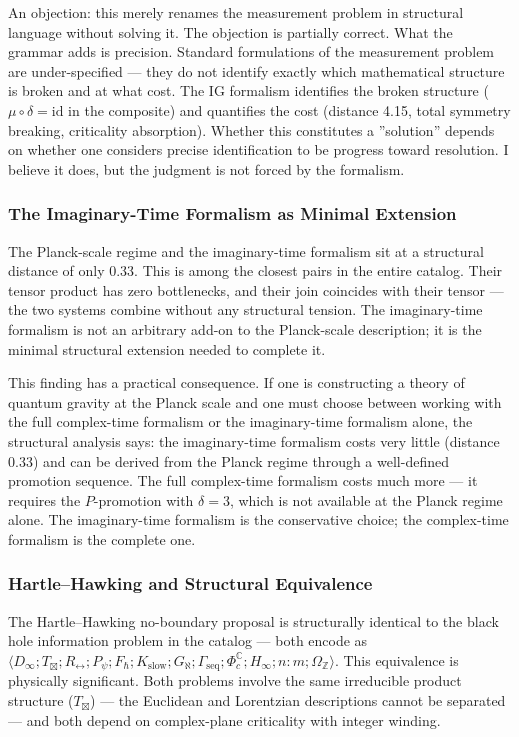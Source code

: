 \documentclass[12pt,a4paper]{article}
\begin{document}
An objection: this merely renames the measurement problem in structural language without solving it. The objection is partially correct. What the grammar adds is precision. Standard formulations of the measurement problem are under-specified --- they do not identify exactly which mathematical structure is broken and at what cost. The IG formalism identifies the broken structure ($\mu \circ \delta = \text{id}$ in the composite) and quantifies the cost (distance 4.15, total symmetry breaking, criticality absorption). Whether this constitutes a ''solution'' depends on whether one considers precise identification to be progress toward resolution. I believe it does, but the judgment is not forced by the formalism.

\subsubsection{The Imaginary-Time Formalism as Minimal Extension}

The Planck-scale regime and the imaginary-time formalism sit at a structural distance of only 0.33. This is among the closest pairs in the entire catalog. Their tensor product has zero bottlenecks, and their join coincides with their tensor --- the two systems combine without any structural tension. The imaginary-time formalism is not an arbitrary add-on to the Planck-scale description; it is the minimal structural extension needed to complete it.

This finding has a practical consequence. If one is constructing a theory of quantum gravity at the Planck scale and one must choose between working with the full complex-time formalism or the imaginary-time formalism alone, the structural analysis says: the imaginary-time formalism costs very little (distance 0.33) and can be derived from the Planck regime through a well-defined promotion sequence. The full complex-time formalism costs much more --- it requires the $P$-promotion with $\delta = 3$, which is not available at the Planck regime alone. The imaginary-time formalism is the conservative choice; the complex-time formalism is the complete one.

\subsubsection{Hartle--Hawking and Structural Equivalence}

The Hartle--Hawking no-boundary proposal is structurally identical to the black hole information problem in the catalog --- both encode as $\langle D_{\infty}; T_{\boxtimes}; R_{\leftrightarrow}; P_{\psi}; F_{\hbar}; K_{\text{slow}}; G_{\aleph}; \Gamma_{\text{seq}}; \Phi_c^\mathbb{C}; H_{\infty}; n{:}m; \Omega_\mathbb{Z} \rangle$. This equivalence is physically significant. Both problems involve the same irreducible product structure ($T_{\boxtimes}$) --- the Euclidean and Lorentzian descriptions cannot be separated --- and both depend on complex-plane criticality with integer winding.
\end{document}
